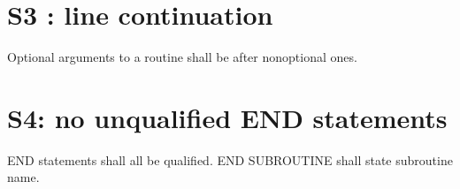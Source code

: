 \documentclass[letterpaper,10pt,english]{sphinxmanual}
\begin{document}
\sphinxstepscope


\section{S3 : line continuation}
\label{\detokenize{rules/S3:s3-line-continuation}}\label{\detokenize{rules/S3::doc}}
\sphinxAtStartPar
Optional arguments to a routine shall be after non\sphinxhyphen{}optional ones.
\def\sphinxLiteralBlockLabel{\label{\detokenize{rules/S3:id1}}}
\begin{sphinxVerbatim}[commandchars=\\\{\}]
\end{sphinxVerbatim}
\def\sphinxLiteralBlockLabel{\label{\detokenize{rules/S3:id2}}}
\begin{sphinxVerbatim}[commandchars=\\\{\}]
\end{sphinxVerbatim}

\sphinxstepscope


\section{S4: no unqualified END statements}
\label{\detokenize{rules/S4:s4-no-unqualified-end-statements}}\label{\detokenize{rules/S4::doc}}
\sphinxAtStartPar
END statements shall all be qualified.
END SUBROUTINE shall state subroutine name.
\end{document}
